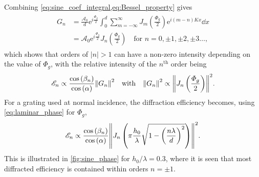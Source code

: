 Combining \cref{eq:sine_coef_integral,eq:Bessel_property} gives
\begin{align}\label{eq:G_terms_sine_phase}
 \begin{split}
 G_n &= \frac{\mathcal{A}_0}{d} \mathrm{e}^{i \frac{\Phi_g}{2}} \int_{0}^{d} \sum_{m=-\infty}^{\infty} J_m \left( \frac{\Phi_g}{2} \right) \mathrm{e}^{i \left( m - n \right) K x} \dd{x} \\
 &= \mathcal{A}_0 \mathrm{e}^{i \frac{\Phi_g}{2} } J_n \left( \frac{\Phi_g}{2} \right) \quad \text{for } n = 0, \pm 1, \pm 2, \pm 3 \dotsc ,
 \end{split}
 \end{align}
which shows that orders of $\left| n \right| > 1$ can have a non-zero intensity depending on the value of $\Phi_g$, with the relative intensity of the $n^{\text{th}}$ order being 
\begin{equation}
 \mathscr{E}_n \propto \frac{\cos \left( \beta_n \right)}{\cos \left( \alpha \right)} \norm{G_n}^2 \quad \text{with} \quad \norm{G_n}^2 \propto \norm{J_n \left( \frac{\Phi_g}{2} \right)}^2. 
 \end{equation}
For a grating used at normal incidence, the diffraction efficiency becomes, using \cref{eq:laminar_phase} for $\Phi_g$, 
\begin{equation}
 \mathscr{E}_n \propto \frac{\cos \left( \beta_n \right)}{\cos \left( \alpha \right)} \norm{J_n \left( \pi \frac{h_0}{\lambda} \sqrt{1 - \left( \frac{n \lambda}{d} \right)^2 } \right)}^2  .
 \end{equation}
This is illustrated in \cref{fig:sine_phase} for $h_0 / \lambda = 0.3$, where it is seen that most diffracted efficiency is contained within orders $n = \pm 1$. 

